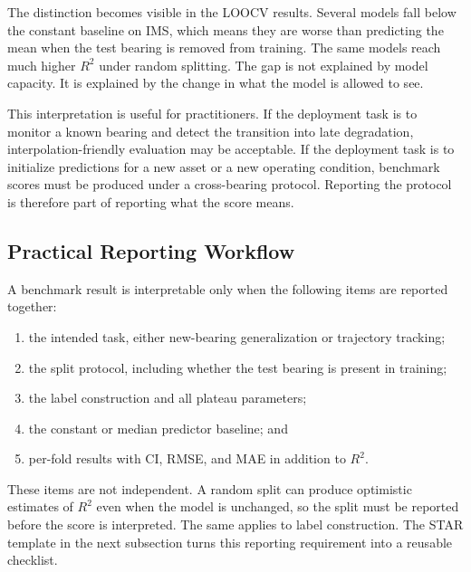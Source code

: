 \documentclass[pdflatex,sn-mathphys-num]{sn-jnl}
\begin{document}
The distinction becomes visible in the LOOCV results. Several models fall below the constant baseline on IMS, which means they are worse than predicting the mean when the test bearing is removed from training. The same models reach much higher $R^2$ under random splitting. The gap is not explained by model capacity. It is explained by the change in what the model is allowed to see.

This interpretation is useful for practitioners. If the deployment task is to monitor a known bearing and detect the transition into late degradation, interpolation-friendly evaluation may be acceptable. If the deployment task is to initialize predictions for a new asset or a new operating condition, benchmark scores must be produced under a cross-bearing protocol. Reporting the protocol is therefore part of reporting what the score means.

\subsection{Practical Reporting Workflow}
A benchmark result is interpretable only when the following items are reported together:
\begin{enumerate}
    \item the intended task, either new-bearing generalization or trajectory tracking;
    \item the split protocol, including whether the test bearing is present in training;
    \item the label construction and all plateau parameters;
    \item the constant or median predictor baseline; and
    \item per-fold results with CI, RMSE, and MAE in addition to $R^2$.
\end{enumerate}
These items are not independent. A random split can produce optimistic estimates of $R^2$ even when the model is unchanged, so the split must be reported before the score is interpreted. The same applies to label construction. The STAR template in the next subsection turns this reporting requirement into a reusable checklist.
\end{document}
